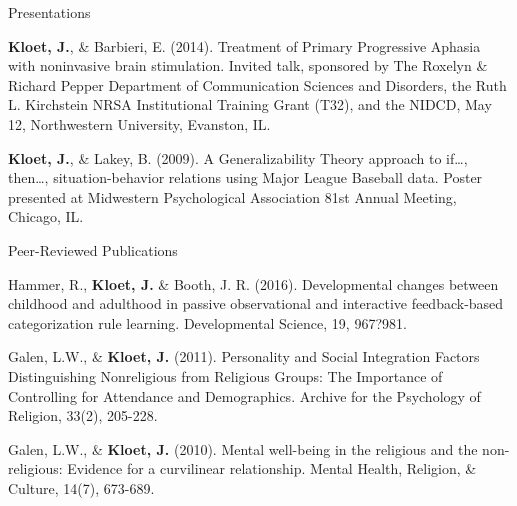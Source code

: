 \vspace{4.0mm}
\begin{cventries}

  \cventry
    {} %
    {Presentations} %
    {} %
    {} %
    {
      \vspace{-4mm}
      \begin{cvitems} %
        \item {{\textbf{Kloet, J.}}, \& Barbieri, E. (2014). Treatment of Primary Progressive Aphasia with noninvasive brain stimulation. Invited talk, sponsored by The Roxelyn \& Richard Pepper Department of Communication Sciences and Disorders, the Ruth L. Kirchstein NRSA Institutional Training Grant (T32), and the NIDCD, May 12, Northwestern University, Evanston, IL. }
        \item {{\textbf{Kloet, J.}}, \& Lakey, B. (2009). A Generalizability Theory approach to if\dots, then\dots, situation-behavior relations using Major League Baseball data. Poster presented at Midwestern Psychological Association 81st Annual Meeting, Chicago, IL.}
      \end{cvitems}
    }

\cventry
    {} %
    {Peer-Reviewed Publications} %
    {} %
    {} %
    {
      \vspace{-4mm}
      \begin{cvitems} %
       \item {Hammer, R., \textbf{Kloet, J.} \& Booth, J. R. (2016). Developmental changes between childhood and adulthood in passive observational and interactive feedback-based categorization rule learning. Developmental Science, 19, 967?981.}
        \item {Galen, L.W., \& \textbf{Kloet, J.} (2011). Personality and Social Integration Factors Distinguishing Nonreligious from Religious Groups: The Importance of Controlling for Attendance and Demographics. Archive for the Psychology of Religion, 33(2), 205-228.}
        \item {Galen, L.W., \& \textbf{Kloet, J.} (2010). Mental well-being in the religious and the non-religious: Evidence for a curvilinear relationship. Mental Health, Religion, \& Culture, 14(7), 673-689.}
      \end{cvitems}
    }

\end{cventries}
